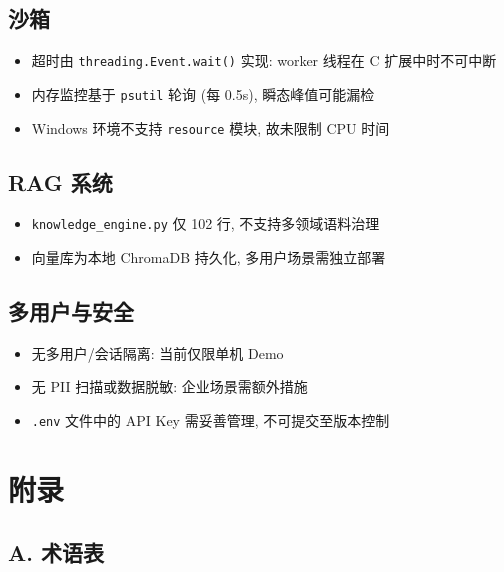 \documentclass[12pt,a4paper]{article}
\begin{document}
\subsection{沙箱}

\begin{itemize}[nosep]
    \item 超时由 \texttt{threading.Event.wait()} 实现: worker 线程在 C 扩展中时不可中断
    \item 内存监控基于 \texttt{psutil} 轮询 (每 0.5s), 瞬态峰值可能漏检
    \item Windows 环境不支持 \texttt{resource} 模块, 故未限制 CPU 时间
\end{itemize}

\subsection{RAG 系统}

\begin{itemize}[nosep]
    \item \texttt{knowledge\_engine.py} 仅 102 行, 不支持多领域语料治理
    \item 向量库为本地 ChromaDB 持久化, 多用户场景需独立部署
\end{itemize}

\subsection{多用户与安全}

\begin{itemize}[nosep]
    \item 无多用户/会话隔离: 当前仅限单机 Demo
    \item 无 PII 扫描或数据脱敏: 企业场景需额外措施
    \item \texttt{.env} 文件中的 API Key 需妥善管理, 不可提交至版本控制
\end{itemize}

\newpage

\section{附录}

\subsection{A. 术语表}
\end{document}
